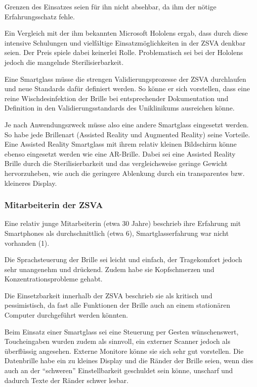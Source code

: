Grenzen des Einsatzes seien für ihn nicht absehbar, da ihm der nötige Erfahrungsschatz fehle.

Ein Vergleich mit der ihm bekannten Microsoft Hololens ergab, dass durch diese intensive Schulungen und vielfältige Einsatzmöglichkeiten in der ZSVA denkbar seien. Der Preis spiele dabei keinerlei Rolle. Problematisch sei bei der Hololens jedoch die mangelnde Sterilisierbarkeit.

Eine Smartglass müsse die strengen Validierungsprozesse der ZSVA durchlaufen und neue Standards dafür definiert werden. So könne er sich vorstellen, dass eine reine Wischdesinfektion der Brille bei entsprechender Dokumentation und Definition in den Validierungsstandards des Uniklinikums ausreichen könne.

Je nach Anwendungszweck müsse also eine andere Smartglass eingesetzt werden. So habe jede Brillenart (Assisted Reality und Augmented Reality) seine Vorteile. Eine Assisted Reality Smartglass mit ihrem relativ kleinen Bildschirm könne ebenso eingesetzt werden wie eine AR-Brille. Dabei sei eine Assisted Reality Brille durch die Sterilisierbarkeit und das vergleichsweise geringe Gewicht hervorzuheben, wie auch die geringere Ablenkung durch ein transparentes bzw. kleineres Display.
%
%
\subsubsection{Mitarbeiterin der ZSVA}
%
Eine relativ junge Mitarbeiterin (etwa 30 Jahre) beschrieb ihre Erfahrung mit Smartphones als durchschnittlich (etwa 6), Smartglasserfahrung war nicht vorhanden (1).

Die Sprachsteuerung der Brille sei leicht und einfach, der Tragekomfort jedoch sehr unangenehm und drückend. Zudem habe sie Kopfschmerzen und Konzentrationsprobleme gehabt.

Die Einsetzbarkeit innerhalb der ZSVA beschrieb sie als kritisch und pessimistisch, da fast alle Funktionen der Brille auch an einem stationären Computer durchgeführt werden könnten. 

Beim Einsatz einer Smartglass sei eine Steuerung per Gesten wünschenswert, Toucheingaben wurden zudem als sinnvoll, ein externer Scanner jedoch als überflüssig angesehen. Externe Monitore könne sie sich sehr gut vorstellen. Die Datenbrille habe ein zu kleines Display und die Ränder der Brille seien, wenn dies auch an der \enquote{schweren} Einstellbarkeit geschuldet sein könne, unscharf und dadurch Texte der Ränder schwer lesbar.

